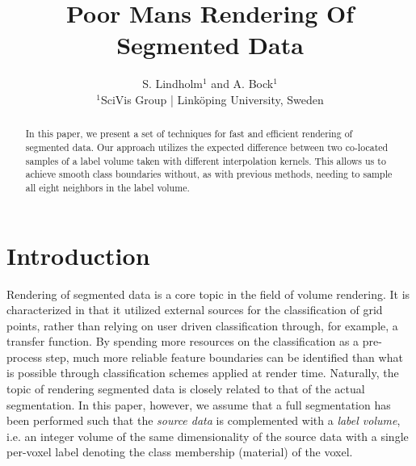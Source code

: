 \documentclass{egpubl}
\title[PMS]%
      {Poor Mans Rendering Of Segmented Data}
\author[S. Lindholm \& A. Bock]
       {S. Lindholm$^{1}$
        and A. Bock$^{1}$
        \\
         $^1$SciVis Group | Link\"{o}ping University, Sweden
       }
\begin{document}

\maketitle

\begin{abstract}
In this paper, we present a set of techniques for fast and efficient rendering of segmented data. Our approach utilizes the expected difference between two co-located samples of a label volume taken with different interpolation kernels. This allows us to achieve smooth class boundaries without, as with previous methods, needing to sample all eight neighbors in the label volume. 

\begin{classification} %
\end{classification}

\end{abstract}




\def\myitem{\diamond}




\section{Introduction}

Rendering of segmented data is a core topic in the field of volume rendering. It is characterized in that it utilized external sources for the classification of grid points, rather than relying on user driven classification through, for example, a transfer function. By spending more resources on the classification as a pre-process step, much more reliable feature boundaries can be identified than what is possible through classification schemes applied at render time. Naturally, the topic of rendering segmented data is closely related to that of the actual segmentation. In this paper, however, we assume that a full segmentation has been performed such that the \emph{source data} is complemented with a \emph{label volume}, i.e. an integer volume of the same dimensionality of the source data with a single per-voxel label denoting the class membership (material) of the voxel.
\end{document}
